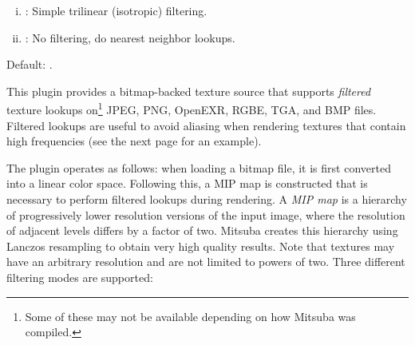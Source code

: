 {{\begin{enumerate}[(i)]
          \item {}: Simple trilinear (isotropic) filtering.\vspace{-1mm}
          \item {}: No filtering, do nearest neighbor lookups.\vspace{-1mm}
      \end{enumerate}
      Default: .
    }
}
This plugin provides a bitmap-backed texture source that supports \emph{filtered}
texture lookups on\footnote{Some of these may not be available depending on how
Mitsuba was compiled.} JPEG, PNG, OpenEXR, RGBE, TGA, and BMP files. Filtered
lookups are useful to avoid aliasing when rendering textures that contain high
frequencies (see the next page for an example).

The plugin operates as follows: when loading a bitmap file, it is first converted
into a linear color space. Following this, a MIP map is constructed that is necessary
to perform filtered lookups during rendering. A \emph{MIP map} is a hierarchy of
progressively lower resolution versions of the input image, where the resolution of
adjacent levels differs by a factor of two. Mitsuba creates this hierarchy using
Lanczos resampling to obtain very high quality results.
Note that textures may have an arbitrary resolution and are not limited to powers of two.
Three different filtering modes are supported:

